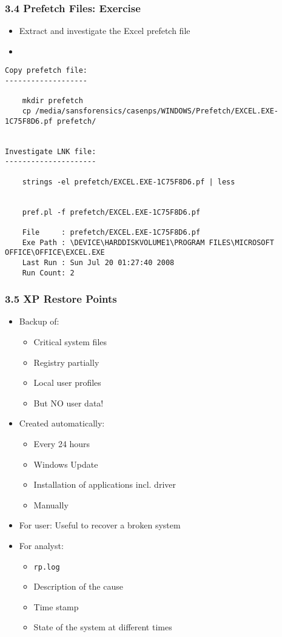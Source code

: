 \begin{frame}[fragile]
  \frametitle{3.4 Prefetch Files: Exercise}
    \begin{itemize}
	    \item[] Extract and investigate the Excel prefetch file
	    \item[] 
    \end{itemize}
  \begin{lstlisting}[basicstyle=\tiny]
Copy prefetch file:
-------------------
  
    mkdir prefetch
    cp /media/sansforensics/casenps/WINDOWS/Prefetch/EXCEL.EXE-1C75F8D6.pf prefetch/


Investigate LNK file:
---------------------

    strings -el prefetch/EXCEL.EXE-1C75F8D6.pf | less


    pref.pl -f prefetch/EXCEL.EXE-1C75F8D6.pf

	File     : prefetch/EXCEL.EXE-1C75F8D6.pf
	Exe Path : \DEVICE\HARDDISKVOLUME1\PROGRAM FILES\MICROSOFT OFFICE\OFFICE\EXCEL.EXE
	Last Run : Sun Jul 20 01:27:40 2008
	Run Count: 2
  \end{lstlisting}
\end{frame}


\begin{frame}[fragile]
  \frametitle{3.5 XP Restore Points}
    \begin{itemize}
        \item Backup of:
        \begin{itemize}
	    \item Critical system files
	    \item Registry partially
            \item Local user profiles
            \item But NO user data!
        \end{itemize}
        \item Created automatically:
        \begin{itemize}
            \item Every 24 hours
            \item Windows Update
	    \item Installation of applications incl. driver
            \item Manually
        \end{itemize}
        \item For user: Useful to recover a broken system
        \item For analyst:
        \begin{itemize}
	    \item \texttt{rp.log}
            \item Description of the cause
            \item Time stamp
            \item State of the system at different times
        \end{itemize}
    \end{itemize}
\end{frame}


